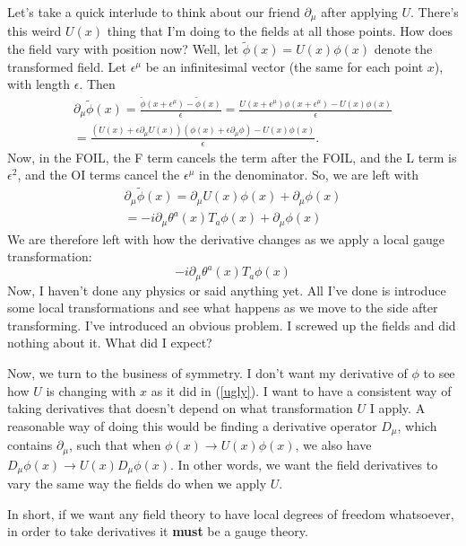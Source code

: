 \documentclass[main.tex]{subfiles}
\begin{document}
Let's take a quick interlude to think about our friend $\partial_\mu$ after applying $U$. There's this weird $U(x)$ thing that I'm doing to the fields at all those points. How does the field vary with position now? Well, let $\tilde{\phi}(x) = U (x) \phi(x)$ denote the transformed field. Let $\epsilon^\mu$ be an infinitesimal vector (the same for each point $x$), with length $\epsilon$. Then
\begin{align*}
\partial_\mu \tilde{\phi} (x) =
\frac{\tilde{\phi} (x + \epsilon^\mu) - \tilde{\phi}(x)}{\epsilon} = 
\frac{U(x + \epsilon^\mu) \phi(x + \epsilon^\mu) - U(x) \phi(x)}{\epsilon} \\ =
\frac{\left( U (x) + \epsilon \partial_\mu U (x)\right) \left(\phi(x) + \epsilon \partial_\mu \phi \right) - U(x) \phi(x)}{\epsilon}.
\end{align*}
Now, in the FOIL, the F term cancels the term after the FOIL, and the L term is $\epsilon^2$, and the OI terms cancel the $\epsilon^\mu$ in the denominator. So, we are left with
\begin{align*}
\partial_\mu \tilde{\phi} (x) = \partial_\mu U (x) \phi(x) + \partial_\mu \phi (x) \\ =
-i \partial_\mu \theta^a (x) T_a \phi(x) + \partial_\mu \phi (x)
\end{align*}
We are therefore left with how the derivative changes as we apply a local gauge transformation:
\begin{equation} \label{ugly}
-i \partial_\mu \theta^a (x) T_a \phi(x) 
\end{equation}
Now, I haven't done any physics or said anything yet. All I've done is introduce some local transformations and see what happens as we move to the side after transforming. I've introduced an obvious problem. I screwed up the fields and did nothing about it. What did I expect?

Now, we turn to the business of symmetry. I don't want my derivative of $\phi$ to see how $U$ is changing with $x$ as it did in (\ref{ugly}). I want to have a consistent way of taking derivatives that doesn't depend on what transformation $U$ I apply. A reasonable way of doing this would be finding a derivative operator $D_\mu$, which contains $\partial_\mu$, such that when $\phi (x) \to U(x) \phi(x)$, we also have $D_\mu \phi(x) \to U(x) D_\mu \phi(x)$. In other words, we want the field derivatives to vary the same way the fields do when we apply $U$.

In short, if we want any field theory to have local degrees of freedom whatsoever, in order to take derivatives it \textbf{must} be a gauge theory.
\end{document}
